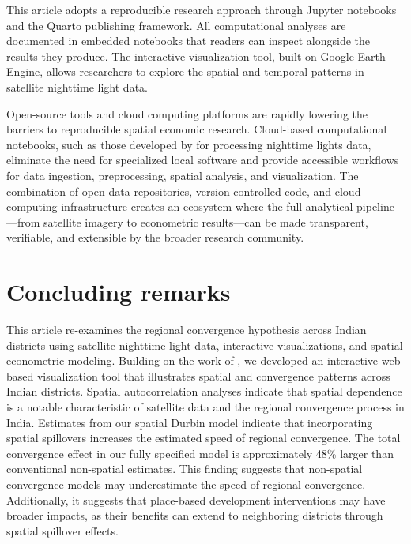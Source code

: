 \documentclass[
  a4paper, 
  twoside,
  review
]{article}
\newcounter{code}
\begin{document}
This article adopts a reproducible research approach through Jupyter
notebooks and the Quarto publishing framework. All computational
analyses are documented in embedded notebooks that readers can inspect
alongside the results they produce. The interactive visualization tool,
built on Google Earth Engine, allows researchers to explore the spatial
and temporal patterns in satellite nighttime light data.

Open-source tools and cloud computing platforms are rapidly lowering the
barriers to reproducible spatial economic research. Cloud-based
computational notebooks, such as those developed by
\citet{mendez_patnaik_notebook} for processing nighttime lights data,
eliminate the need for specialized local software and provide accessible
workflows for data ingestion, preprocessing, spatial analysis, and
visualization. The combination of open data repositories,
version-controlled code, and cloud computing infrastructure creates an
ecosystem where the full analytical pipeline---from satellite imagery to
econometric results---can be made transparent, verifiable, and
extensible by the broader research community.

\section{Concluding remarks}\label{concluding-remarks}

This article re-examines the regional convergence hypothesis across
Indian districts using satellite nighttime light data, interactive
visualizations, and spatial econometric modeling. Building on the work
of \citet{chanda_kabiraj_district_convergence}, we developed an
interactive web-based visualization tool that illustrates spatial and
convergence patterns across Indian districts. Spatial autocorrelation
analyses indicate that spatial dependence is a notable characteristic of
satellite data and the regional convergence process in India. Estimates
from our spatial Durbin model indicate that incorporating spatial
spillovers increases the estimated speed of regional convergence. The
total convergence effect in our fully specified model is approximately
48\% larger than conventional non-spatial estimates. This finding
suggests that non-spatial convergence models may underestimate the speed
of regional convergence. Additionally, it suggests that place-based
development interventions may have broader impacts, as their benefits
can extend to neighboring districts through spatial spillover effects.
\end{document}
